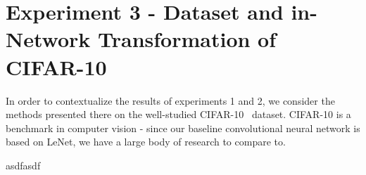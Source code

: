 \chapter{Experiment 3 - Dataset and in-Network Transformation of CIFAR-10}
\label{chap:five}

In order to contextualize the results of experiments 1 and 2, we consider the methods presented there on the well-studied  CIFAR-10~\cite{krizhevsky2009learning} dataset.
CIFAR-10 is a benchmark in computer vision - since our baseline convolutional neural network is based on LeNet, we have a large body of research to compare to.

asdfasdf